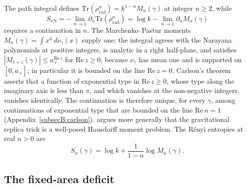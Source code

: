 \documentclass[11pt,letterpaper]{article}
\theoremstyle{plain}
\theoremstyle{definition}
\theoremstyle{remark}
\begin{document}
The path integral defines $\mathrm{Tr}(\rho_{\mathrm{rad}}^n) = k^{1-n}M_n(\gamma)$ at integer $n \ge 2$, while
\begin{equation}
\label{eq03:replica_trick}
S_{\mathrm{vN}} = -\lim_{n \to 1} \partial_n \mathrm{Tr}(\rho_{\mathrm{rad}}^n) = \log k - \lim_{n \to 1} \partial_n M_n(\gamma)
\end{equation}
requires a continuation in $n$. The Marchenko--Pastur moments $M_n(\gamma) = \int x^n\, d\nu_\gamma(x)$ supply one: the integral agrees with the Narayana polynomials at positive integers, is analytic in a right half-plane, and satisfies $|M_{1+z}(\gamma)| \le a_+^{\mathrm{Re}\,z}$ for $\mathrm{Re}\,z \ge 0$, because $\nu_\gamma$ has mean one and is supported on $[0, a_+]$; in particular it is bounded on the line $\mathrm{Re}\,z = 0$. Carlson's theorem~\citep{carlson1914} asserts that a function of exponential type in $\mathrm{Re}\,z \ge 0$, whose type along the imaginary axis is less than $\pi$, and which vanishes at the non-negative integers, vanishes identically. The continuation is therefore unique, for every $\gamma$, among continuations of exponential type that are bounded on the line $\mathrm{Re}\,n = 1$ (Appendix~\ref{subsecB:carlson}). \citet{wang2023} argues more generally that the gravitational replica trick is a well-posed Hausdorff moment problem. The R\'enyi entropies at real $n > 0$ are
\begin{equation}
\label{eq03:renyi_real_n}
S_n(\gamma) = \log k + \frac{1}{1-n}\log M_n(\gamma) .
\end{equation}

\subsection{The fixed-area deficit}
\label{subsec03:pssy_scaling}
\end{document}
